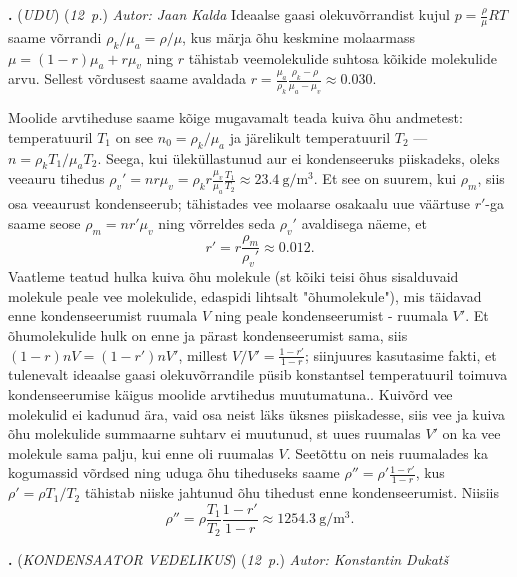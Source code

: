 \documentclass[11pt,a5paper]{article}
\newcommand{\numb}[1]{\vspace{5pt}\textbf{\large #1}}
\newcommand{\nimi}[1]{(\textsl{\small \uppercase{#1}})}
\newcommand{\punktid}[1]{(\emph{#1~p.})}
\newcounter{ylesanne}
\newcommand{\yl}[1]{\addtocounter{ylesanne}{1}\numb{\theylesanne.} \nimi{#1} \newblock{}}
\newcommand{\autor}[1]{\emph{Autor: #1}}%
\begin{document}
\yl{Udu}
\punktid{12} \autor{Jaan Kalda}
Ideaalse gaasi olekuvõrrandist kujul $p=\frac \rho\mu RT$ saame võrrandi $\rho_k/\mu_a=\rho/\mu$, kus märja õhu keskmine molaarmass $\mu=(1-r)\mu_a+r\mu_v$ ning $r$ tähistab veemolekulide suhtosa kõikide molekulide arvu. Sellest võrdusest saame avaldada $r=\frac {\mu_a}{\rho_k}\frac{\rho_k-\rho}{\mu_a-\mu_v}\approx \num{0.030}$.

Moolide arvtiheduse saame kõige mugavamalt teada kuiva õhu andmetest: temperatuuril $T_1$ on see $n_0=\rho_k/\mu_a$ ja järelikult temperatuuril $T_2$ ---  $n=\rho_kT_1/\mu_aT_2$. Seega, kui üleküllastunud aur ei kondenseeruks piiskadeks, oleks veeauru tihedus $\rho_v'=nr\mu_v= \rho_kr\frac {\mu_v}{\mu_a}\frac{T_1}{T_2}\approx\SI{23.4}{\g\per\m\cubed}$. Et see on suurem, kui $\rho_m$, siis osa veeaurust kondenseerub; tähistades vee molaarse osakaalu uue väärtuse $r'$-ga saame seose $\rho_m=nr'\mu_v$ ning võrreldes seda $\rho_v'$ avaldisega näeme, et
\[
  r'=r\frac {\rho_m}{\rho_v'}\approx \num{0.012}.
\]
Vaatleme teatud hulka kuiva õhu molekule (st kõiki teisi õhus sisalduvaid molekule peale vee molekulide, edaspidi lihtsalt "õhumolekule"), mis täidavad enne kondenseerumist ruumala $V$ ning peale kondenseerumist - ruumala $V'$. Et õhumolekulide hulk on enne ja pärast kondenseerumist sama, siis $(1-r)nV=(1-r')nV'$, millest $V/V'=\frac{1-r'}{1-r}$; siinjuures kasutasime fakti, et tulenevalt ideaalse gaasi olekuvõrrandile püsib konstantsel temperatuuril toimuva kondenseerumise käigus moolide arvtihedus muutumatuna.. Kuivõrd vee molekulid ei kadunud ära, vaid osa neist läks üksnes piiskadesse, siis  vee ja kuiva õhu molekulide summaarne suhtarv ei muutunud, st uues ruumalas $V'$ on ka vee molekule sama palju, kui enne oli ruumalas $V$. Seetõttu on neis ruumalades ka kogumassid võrdsed ning uduga õhu tiheduseks saame  $\rho''=\rho'\frac{1-r'}{1-r}$, kus $\rho'=\rho T_1/T_2$ tähistab niiske jahtunud õhu tihedust enne kondenseerumist. Niisiis
\[\rho''=\rho \frac{T_1}{T_2} \frac{1-r'}{1-r}\approx \SI{1254.3}{\g\per\m\cubed}.\]


\yl{Kondensaator vedelikus}
\punktid{12} \autor{Konstantin Dukatš}
\end{document}
